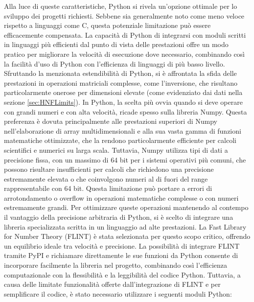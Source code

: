 Alla luce di queste caratteristiche, Python si rivela un'opzione ottimale per lo sviluppo 
dei progetti richiesti. Sebbene sia generalmente noto come meno veloce rispetto a 
linguaggi come C, questa potenziale limitazione può essere efficacemente compensata. 
La capacità di Python di integrarsi con moduli scritti in linguaggi più efficienti dal 
punto di vista delle prestazioni offre un modo pratico per migliorare la velocità di 
esecuzione dove necessario, combinando così la facilità d'uso di Python con l'efficienza 
di linguaggi di più basso livello.
Sfruttando la menzionata estendibilità di Python, si è affrontata la sfida delle prestazioni 
in operazioni matriciali complesse, come l'inversione, che risultano particolarmente onerose 
per dimensioni elevate (come evidenziato dai dati nella sezione \ref{sec:HNFLimits}). 
In Python, la scelta più ovvia quando si deve operare con grandi numeri e con alta velocità,
ricade spesso sulla libreria Numpy. 
Questa preferenza è dovuta principalmente alle prestazioni superiori di Numpy nell'elaborazione 
di array multidimensionali e alla sua vasta gamma di funzioni matematiche ottimizzate, 
che la rendono particolarmente efficiente per calcoli scientifici e numerici su larga scala. 
Tuttavia, Numpy utilizza tipi di dati a precisione fissa, con un massimo di 64 bit per i 
sistemi operativi più comuni, che 
possono risultare insufficienti per calcoli che richiedono una precisione estremamente 
elevata o che coinvolgono numeri al di fuori del range rappresentabile con 64 bit. 
Questa limitazione può portare a errori di arrotondamento o overflow in operazioni 
matematiche complesse o con numeri estremamente grandi.
Per ottimizzare queste operazioni mantenendo al contempo il vantaggio della precisione 
arbitraria di Python, si è scelto di integrare una libreria specializzata scritta in un 
linguaggio ad alte prestazioni. La Fast Library for Number Theory \cite{FLINT} (FLINT) è stata 
selezionata per questo scopo critico, offrendo un equilibrio ideale tra velocità e 
precisione.
La possibilità di integrare FLINT tramite PyPI e richiamare direttamente le sue funzioni 
da Python consente di incorporare facilmente la libreria nel progetto, combinando così 
l'efficienza computazionale con la flessibilità e la leggibilità del codice Python. 
Tuttavia, a causa delle limitate funzionalità offerte dall'integrazione di FLINT e per 
semplificare il codice, è stato necessario utilizzare i seguenti moduli Python:

